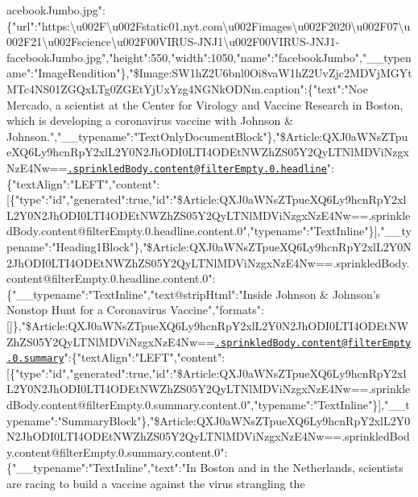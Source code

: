 acebookJumbo.jpg":\{"url":"https:\textbackslash{}u002F\textbackslash{}u002Fstatic01.nyt.com\textbackslash{}u002Fimages\textbackslash{}u002F2020\textbackslash{}u002F07\textbackslash{}u002F21\textbackslash{}u002Fscience\textbackslash{}u002F00VIRUS-JNJ1\textbackslash{}u002F00VIRUS-JNJ1-facebookJumbo.jpg","height":550,"width":1050,"name":"facebookJumbo","\_\_typename":"ImageRendition"\},"\$Image:SW1hZ2U6bnl0Oi8vaW1hZ2UvZjc2MDVjMGYtMTc4NS01ZGQxLTg0ZGEtYjUxYzg4NGNkODNm.caption":\{"text":"Noe
Mercado, a scientist at the Center for Virology and Vaccine Research in
Boston, which is developing a coronavirus vaccine with Johnson \&
Johnson.","\_\_typename":"TextOnlyDocumentBlock"\},"\$Article:QXJ0aWNsZTpueXQ6Ly9hcnRpY2xlL2Y0N2JhODI0LTI4ODEtNWZhZS05Y2QyLTNlMDViNzgxNzE4Nw==\href{mailto:.sprinkledBody.content@filterEmpty.0.headline}{\nolinkurl{.sprinkledBody.content@filterEmpty.0.headline}}":\{"textAlign":"LEFT","content":{[}\{"type":"id","generated":true,"id":"\$Article:QXJ0aWNsZTpueXQ6Ly9hcnRpY2xlL2Y0N2JhODI0LTI4ODEtNWZhZS05Y2QyLTNlMDViNzgxNzE4Nw==.sprinkledBody.content@filterEmpty.0.headline.content.0","typename":"TextInline"\}{]},"\_\_typename":"Heading1Block"\},"\$Article:QXJ0aWNsZTpueXQ6Ly9hcnRpY2xlL2Y0N2JhODI0LTI4ODEtNWZhZS05Y2QyLTNlMDViNzgxNzE4Nw==.sprinkledBody.content@filterEmpty.0.headline.content.0":\{"\_\_typename":"TextInline","text@stripHtml":"Inside
Johnson \& Johnson's Nonstop Hunt for a Coronavirus
Vaccine","formats":{[}{]}\},"\$Article:QXJ0aWNsZTpueXQ6Ly9hcnRpY2xlL2Y0N2JhODI0LTI4ODEtNWZhZS05Y2QyLTNlMDViNzgxNzE4Nw==\href{mailto:.sprinkledBody.content@filterEmpty.0.summary}{\nolinkurl{.sprinkledBody.content@filterEmpty.0.summary}}":\{"textAlign":"LEFT","content":{[}\{"type":"id","generated":true,"id":"\$Article:QXJ0aWNsZTpueXQ6Ly9hcnRpY2xlL2Y0N2JhODI0LTI4ODEtNWZhZS05Y2QyLTNlMDViNzgxNzE4Nw==.sprinkledBody.content@filterEmpty.0.summary.content.0","typename":"TextInline"\}{]},"\_\_typename":"SummaryBlock"\},"\$Article:QXJ0aWNsZTpueXQ6Ly9hcnRpY2xlL2Y0N2JhODI0LTI4ODEtNWZhZS05Y2QyLTNlMDViNzgxNzE4Nw==.sprinkledBody.content@filterEmpty.0.summary.content.0":\{"\_\_typename":"TextInline","text":"In
Boston and in the Netherlands, scientists are racing to build a vaccine
against the virus strangling the

